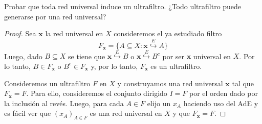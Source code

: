 \documentclass{article}
\theoremstyle{plain}
\theoremstyle{definition}
\newcommand{\evto}[1]{\stackrel{E}{\hookrightarrow} #1}   %
\newenvironment{ejercicio}[1]{\begin{trivlist}
\item[\hskip \labelsep {\bfseries Ejercicio}\hskip \labelsep {\bfseries #1.}]}{\end{trivlist}}
\begin{document}
\begin{ejercicio}{10}
    Probar que toda red universal induce un ultrafiltro. ¿Todo ultrafiltro puede generarse por una red universal?
\end{ejercicio}
\begin{proof}
    Sea \( \mathbf{x} \) la red universal en \( X \) consideremos el ya estudiado filtro \[
        F_{\mathbf{x}} = \{ A \subseteq X : \mathbf{x} \evto{A} \}
    \]
    Luego, dado \( B \subseteq X \) se tiene que \( \mathbf{x} \evto{B} \) o \( \mathbf{x} \evto{B^c} \) por ser \( \mathbf{x} \) universal en \( X \).
    Por lo tanto, \( B \in F_{\mathbf{x}} \) o \( B^c \in F_{\mathbf{x}} \) y, por lo tanto, \( F_{\mathbf{x}} \) es un ultrafiltro.

    Consideremos un ultrafiltro \( F \) en \( X \) y construyamos una red universal \( \mathbf{x} \) tal que \( F_{\mathbf{x}} = F \).
    Para ello, consideremos el conjunto dirigido \( I = F \) por el orden dado por la inclusión al revés. Luego, para cada \( A \in F \)
    elijo un \( x_A \) haciendo uso del AdE y es fácil ver que \( {(x_A)}_{A \in F} \) es una red universal en \( X \) y que \( F_{\mathbf{x}} = F \).
\end{proof}
\end{document}
